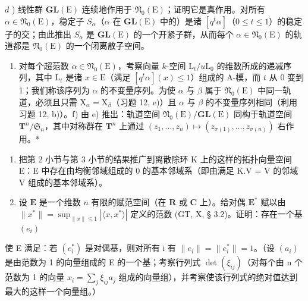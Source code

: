 \(d\) ) 线性群 \(\mathbf{GL}(\mathrm{E})\) 连续地作用于 \(\mathfrak{N}_0(\mathrm{E})\)；证明它是真作用。对所有 \(\alpha \in \mathfrak{N}_0(\mathrm{E})\)，稳定子 \(S_{\alpha}\)（\(\alpha\) 在 \(\mathbf{GL}(\mathrm{E})\) 中的）是诸 \([q^t\alpha]\)（\(0\leqslant t\leqslant 1\)）的稳定子的交；由此推出 \(S_{\alpha}\) 是 \(\mathbf{GL}(\mathrm{E})\) 的一个开紧子群，从而每个 \(\alpha \in \mathfrak{N}_0(\mathrm{E})\) 的轨道都是 \(\mathfrak{N}_0(\mathrm{E})\) 的一个闭离散子空间。

\begin{enumerate}
\def\labelenumi{\alph{enumi})}
\setcounter{enumi}{4}
\tightlist
\item
  对每个超范数 \(\alpha \in \mathfrak{N}_0(\mathrm{E})\)，考察向量 \(k\)-空间 \(\mathrm{L}_t / u\mathrm{L}_0\) 的维数所成的递减序列，其中 \(\mathrm{L}_t\) 是诸 \(x \in \mathrm{E}\)（满足 \([q^t\alpha](x) \leqslant 1\)）组成的 A-模，而 \(t\) 从 0 变到 1；我们称该序列为 \(\alpha\) 的不变量序列。为使 \(\alpha\) 与 \(\beta\) 属于 \(\mathfrak{N}_0(\mathrm{E})\) 中同一轨道，必须且只需 \(\mathrm{X}_{\alpha} = \mathrm{X}_{\beta}\)（习题 12, e)）且 \(\alpha\) 与 \(\beta\) 的不变量序列相同（利用习题 12, b)）。f) 由 e) 推出：轨道空间 \(\mathfrak{N}_0(\mathrm{E}) / \mathbf{GL}(\mathrm{E})\) 同构于轨道空间 \(\mathbf{T}^n / \mathfrak{S}_n\)，其中对称群在 \(\mathbf{T}^n\) 上通过 \((z_1, ..., z_n) \mapsto (z_{\sigma(1)}, ..., z_{\sigma(n)})\) 右作用。*
\end{enumerate}

\begin{enumerate}
\def\labelenumi{\arabic{enumi})}
\setcounter{enumi}{13}
\item
  把第 2 小节与第 3 小节的结果推广到离散除环 K 上的这样的拓扑向量空间 E：E 中存在由均衡邻域组成的 0 的基本邻域系（即由满足 K.V = V 的邻域 V 组成的基本邻域系）。
\item
  设 \(\mathbf{E}\) 是一个维数 \(n\) 有限的赋范空间（在 \(\mathbf{R}\) 或 \(\mathbf{C}\) 上）。给对偶 \(\mathbf{E}^*\) 赋以由 \(\| x^* \| = \sup_{\| x \| \leqslant 1} |\langle x, x^* \rangle|\) 定义的范数 (GT, X, § 3.2)。证明：存在一个基 \((e_i)\)
\end{enumerate}

使 E 满足：若 \((e_{i}^{*})\) 是对偶基，则对所有 i 有 \(\|e_{i}\| = \|e_{i}^{*}\| = 1\)。（设 \((a_{i})\) 是由范数为 1 的向量组成的 E 的一个基；考察行列式 \(\det(\xi_{ij})\)（对每个由 n 个范数为 1 的向量 \(x_{i} = \sum_{j} \xi_{ij} a_{j}\) 组成的向量组），并考察使该行列式的绝对值达到最大的这样一个向量组。）

\exercisegroup


